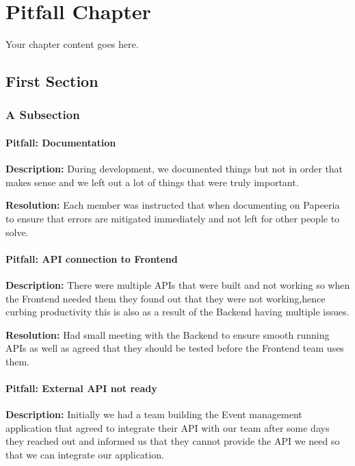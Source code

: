 \chapter{Pitfall Chapter}

Your chapter content goes here. 

\section{First Section}

\subsection{A Subsection}


\subsubsection*{Pitfall: Documentation}
\textbf{Description:} During development, we documented things but not in order that makes sense and we left out a lot of things that were truly important.  

\textbf{Resolution:} Each member was instructed that when documenting on Papeeria to ensure that errors are mitigated immediately and not left for other people to solve.  

\subsubsection*{Pitfall: API connection to Frontend}
\textbf{Description:} There were multiple APIs that were built and not working so when the Frontend needed them they found out that they were not working,hence curbing productivity this is also as a result of the Backend having multiple issues.  

\textbf{Resolution:} Had small meeting with the Backend to ensure smooth running APIs as well as agreed that they should be tested before the Frontend team uses them.

\subsubsection*{Pitfall: External API not ready}
\textbf{Description:} Initially we had a team building the Event management application that agreed to integrate their API with our team after some days they reached out and informed us that they cannot provide the API we need so that we can integrate our application.  


